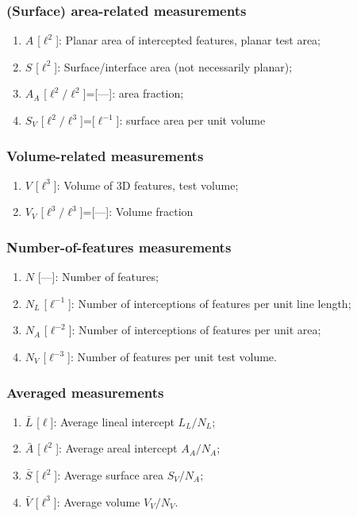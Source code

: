 \subsubsection{(Surface) area-related measurements}

\begin{enumerate}
\item $A$ [$\ell^2$]: Planar area of intercepted features, planar test area;
\item $S$ [$\ell^2$]: Surface/interface area (not necessarily planar);
\item $A_A$ [$\ell^2/\ell^2$]=[---]: area fraction;
\item $S_V$ [$\ell^2/\ell^3$]=[$\ell^{-1}$]: surface area per unit volume\\
\end{enumerate}

\subsubsection{Volume-related measurements}

\begin{enumerate}
\item $V$ [$\ell^3$]: Volume of 3D features, test volume;
\item $V_V$ [$\ell^3/\ell^3$]=[---]:  Volume fraction\\
\end{enumerate}


\subsubsection{Number-of-features measurements}

\begin{enumerate}
\item $N$ [---]: Number of features;
\item $N_L$ [$\ell^{-1}$]: Number of interceptions of features per unit line length;
\item $N_A$ [$\ell^{-2}$]: Number of interceptions of features per unit area;
\item $N_V$ [$\ell^{-3}$]:  Number  of features per unit test volume.
\end{enumerate}

\subsubsection{Averaged measurements}

\begin{enumerate}
\item $\bar{L}$  [$\ell$]: Average lineal intercept $L_L/N_L$;
\item $\bar{A}$ [$\ell^2$]: Average areal intercept $A_A/N_A$;
\item $\bar{S}$ [$\ell^2$]: Average surface area $S_V/N_A$;
\item $\bar{V}$ [$\ell^3$]: Average volume $V_V/N_V$.
\end{enumerate}

